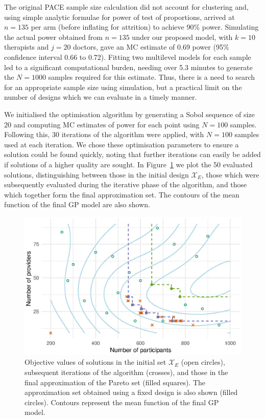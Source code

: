 \documentclass{article}
\begin{document}
The original PACE sample size calculation did not account for clustering and, using simple analytic formulae for power of test of proportions, arrived at $n = 135$ per arm (before inflating for attrition) to achieve 90\% power. Simulating the actual power obtained from $n=135$ under our proposed model, with $k = 10$ therapists and $j = 20$ doctors, gave an MC estimate of 0.69 power (95\% confidence interval 0.66 to 0.72). Fitting two multilevel models for each sample led to a significant computational burden, needing over 5.3 minutes to generate the $N=1000$ samples required for this estimate. Thus, there is a need to search for an appropriate sample size using simulation, but a practical limit on the number of designs which we can evaluate in a timely manner. 

We initialised the optimisation algorithm by generating a Sobol sequence of size 20 and computing MC estimates of power for each point using $N = 100$ samples. Following this, 30 iterations of the algorithm were applied, with $N = 100$ samples used at each iteration. We chose these optimisation parameters to ensure a solution could be found quickly, noting that further iterations can easily be added if solutions of a higher quality are sought. In Figure~\ref{fig:ex1_single_run} we plot the 50 evaluated solutions, distinguishing between those in the initial design $\mathcal{X}_{E}$, those which were subsequently evaluated during the iterative phase of the algorithm, and those which together form the final approximation set. The contours of the mean function of the final GP model are also shown. 

\begin{figure}
\centering
\includegraphics[scale=0.8]{ex1_single_run}
\caption{Objective values of solutions in the initial set $\mathcal{X}_{E}$ (open circles), subsequent iterations of the algorithm (crosses), and those in the final approximation of the Pareto set (filled squares). The approximation set obtained using a fixed design is also shown (filled circles). Contours represent the mean function of the final GP model.}
\label{fig:ex1_single_run}
\end{figure}
\end{document}
